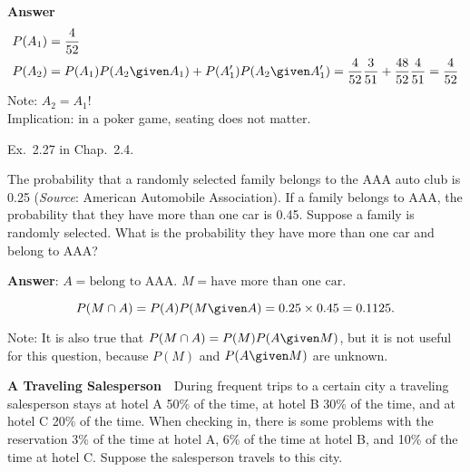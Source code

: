 \documentclass[12pt]{article}
\begin{document}
\textbf{Answer}\\
\begin{align*}
P(A_1) &= \frac{4}{52}
\\
P(A_2) &= P(A_1) P(A_2 \given A_1) + P(A_1') P(A_2 \given A_1')
        = \frac{4}{52} \frac{3}{51} + \frac{48}{52} \frac{4}{51}
        = \frac{4}{52}
\end{align*}
Note: $A_2 = A_1$!\\
Implication: in a poker game, seating does not matter.

\example
Ex.~2.27 in Chap.~2.4.


\example
The probability that a randomly selected family belongs to the AAA auto club
is 0.25 (\textit{Source}: American Automobile Association). If a family
belongs to AAA, the probability that they have more than one car is 0.45.
Suppose a family is randomly selected.
What is the probability they have more than one car and belong to AAA?

\textbf{Answer}:
$A = \text{belong to AAA}$.
$M = \text{have more than one car}$.

\[
P(M \cap A)
= P(A) P(M \given A)
= 0.25 \times 0.45
= 0.1125.
\]

Note: It is also true that
$P(M \cap A) = P(M) P(A \given M)$,
but it is not useful for this question,
because $P(M)$ and $P(A \given M)$ are unknown.


% 
% 
% 
% 

\example
\textbf{A Traveling Salesperson}\ \ During frequent trips to a certain
city a traveling salesperson stays at hotel A 50\% of the time,
at hotel B 30\% of the time, and at hotel C 20\% of the time.
When checking in, there is some problems with the reservation 3\%
of the time at hotel A, 6\% of the time at hotel B,
and 10\% of the time at hotel C.
Suppose the salesperson travels to this city.
\end{document}
